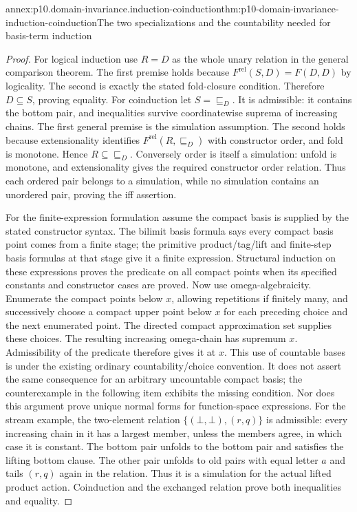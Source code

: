 \begin{annexitem}{annex:p10.domain-invariance.induction-coinduction}{thm:p10-domain-invariance-induction-coinduction}{The two specializations and the countability needed for basis-term induction}
\begin{proof}
For logical induction use \(R=D\) as the whole unary relation
in the general comparison theorem. The first premise holds
because \(F^{\mathrm{rel}}(S,D)=F(D,D)\) by logicality.
The second is exactly the stated fold-closure condition.
Therefore \(D\subseteq S\), proving equality.
For coinduction let \(S=\sqsubseteq_D\). It is admissible:
it contains the bottom pair, and inequalities survive
coordinatewise suprema of increasing chains.
The first general premise is the simulation assumption.
The second holds because extensionality identifies
\(F^{\mathrm{rel}}(R,\sqsubseteq_D)\) with constructor order,
and fold is monotone. Hence \(R\subseteq\sqsubseteq_D\).
Conversely order is itself a simulation: unfold is monotone,
and extensionality gives the required constructor order relation.
Thus each ordered pair belongs to a simulation, while no simulation
contains an unordered pair, proving the iff assertion.

For the finite-expression formulation assume the compact basis
is supplied by the stated constructor syntax. The bilimit basis
formula says every compact basis point comes from a finite stage;
the primitive product/tag/lift and finite-step basis formulas at
that stage give it a finite expression. Structural induction on
these expressions proves the predicate on all compact points
when its specified constants and constructor cases are proved.
Now use omega-algebraicity. Enumerate the compact points below
\(x\), allowing repetitions if finitely many, and successively
choose a compact upper point below \(x\) for each preceding
choice and the next enumerated point. The directed compact
approximation set supplies these choices. The resulting increasing
omega-chain has supremum \(x\). Admissibility of the predicate
therefore gives it at \(x\). This use of countable bases is
under the existing ordinary countability/choice convention.
It does not assert the same consequence for an arbitrary
uncountable compact basis; the counterexample in the following
item exhibits the missing condition. Nor does this argument
prove unique normal forms for function-space expressions.
For the stream example, the two-element relation
\(\{(\bot,\bot),(r,q)\}\) is admissible: every increasing
chain in it has a largest member, unless the members agree,
in which case it is constant. The bottom pair unfolds to the
bottom pair and satisfies the lifting bottom clause.
The other pair unfolds to old pairs with equal letter \(a\)
and tails \((r,q)\) again in the relation. Thus it is a
simulation for the actual lifted product action. Coinduction
and the exchanged relation prove both inequalities and equality.
\end{proof}
\end{annexitem}

